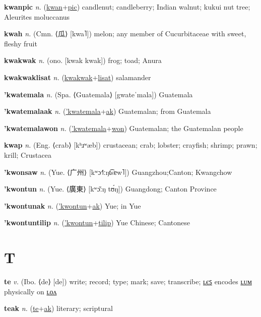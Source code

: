 \textbf{\hypertarget{kwanpic}{kwanpic}} \textit{n.} (\hyperlink{kwan}{kwan}+\allowbreak \hyperlink{pic}{pic})
candlenut; candleberry; Indian walnut; kukui nut tree; Aleurites moluccanus

\textbf{\hypertarget{kwah}{kwah}} \textit{n.} (Cmn. ⟨{\chinese{}瓜}⟩ [kwa˥])
melon; any member of Cucurbitaceae with sweet, fleshy fruit

\textbf{\hypertarget{kwakwak}{kwakwak}} \textit{n.} (ono. [kwak kwak])
frog; toad; Anura

\textbf{\hypertarget{kwakwaklisat}{kwakwaklisat}} \textit{n.} (\hyperlink{kwakwak}{kwakwak}+\allowbreak \hyperlink{lisat}{lisat})
salamander

\textbf{\hypertarget{'kwatemala}{'kwatemala}} \textit{n.} (Spa. ⟨Guatemala⟩ [gwateˈmala])
Guatemala

\textbf{\hypertarget{'kwatemalaak}{'kwatemalaak}} \textit{n.} (\hyperlink{'kwatemala}{'kwatemala}+\allowbreak \hyperlink{ak}{ak})
Guatemalan; from Guatemala

\textbf{\hypertarget{'kwatemalawon}{'kwatemalawon}} \textit{n.} (\hyperlink{'kwatemala}{'kwatemala}+\allowbreak \hyperlink{won}{won})
Guatemalan; the Guatemalan people

\textbf{\hypertarget{kwap}{kwap}} \textit{n.} (Eng. ⟨crab⟩ [kʰɹʷæb])
crustacean; crab; lobster; crayfish; shrimp; prawn; krill; Crustacea

\textbf{\hypertarget{'kwonsaw}{'kwonsaw}} \textit{n.} (Yue. ⟨{\chinese{}广州}⟩ [kʷɔ˧˥ːŋt͡sɐw˥])
Guangzhou;Canton; Kwangchow

\textbf{\hypertarget{'kwontun}{'kwontun}} \textit{n.} (Yue. ⟨{\chinese{}廣東}⟩ [kʷɔ̌ːŋ tʊ́ŋ])
Guangdong; Canton Province

\textbf{\hypertarget{'kwontunak}{'kwontunak}} \textit{n.} (\hyperlink{'kwontun}{'kwontun}+\allowbreak \hyperlink{ak}{ak})
Yue; in Yue

\textbf{\hypertarget{'kwontuntilip}{'kwontuntilip}} \textit{n.} (\hyperlink{'kwontun}{'kwontun}+\allowbreak \hyperlink{tilip}{tilip})
Yue Chinese; Cantonese

\section{T}

\textbf{\hypertarget{te}{te}} \textit{v.} (Ibo. ⟨de⟩ [de])
write; record; type; mark; save; transcribe; \hyperlink{teles}{ʟєꜱ} encodes \hyperlink{telum}{ʟᴜᴍ} physically on \hyperlink{telon}{ʟᴏᴧ}

\textbf{\hypertarget{teak}{teak}} \textit{n.} (\hyperlink{te}{te}+\allowbreak \hyperlink{ak}{ak})
literary; scriptural

